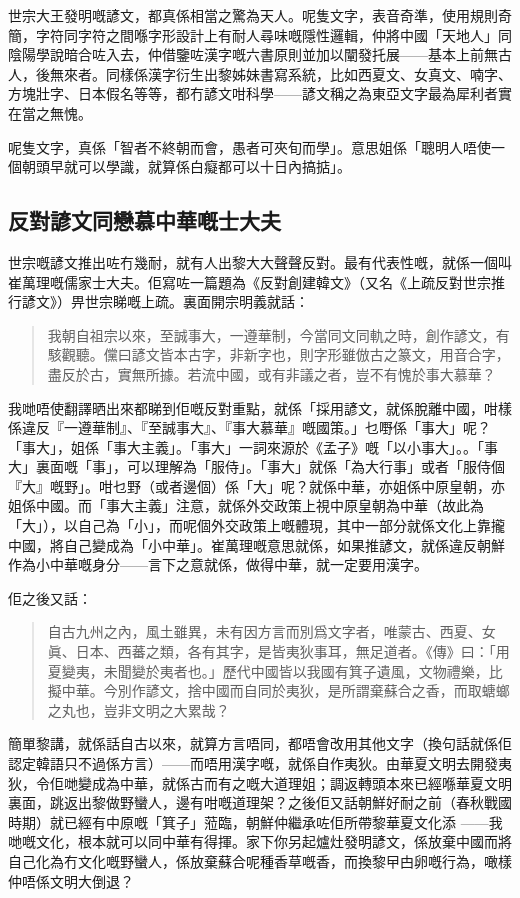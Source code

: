 世宗大王發明嘅諺文，都真係相當之驚為天人。呢隻文字，表音奇準，使用規則奇簡，字符同字符之間喺字形設計上有耐人尋味嘅隱性邏輯，仲將中國「天地人」同陰陽學說暗合咗入去，仲借鑒咗漢字嘅六書原則並加以闡發托展——基本上前無古人，後無來者。同樣係漢字衍生出黎姊妹書寫系統，比如西夏文、女真文、喃字、方塊壯字、日本假名等等，都冇諺文咁科學——諺文稱之為東亞文字最為犀利者實在當之無愧。

呢隻文字，真係「智者不終朝而會，愚者可夾旬而學」。意思姐係「聰明人唔使一個朝頭早就可以學識，就算係白癡都可以十日內搞掂」。

\subsection*{反對諺文同戀慕中華嘅士大夫}
世宗嘅諺文推出咗冇幾耐，就有人出黎大大聲聲反對。最有代表性嘅，就係一個叫崔萬理嘅儒家士大夫。佢寫咗一篇題為《反對創建韓文》（又名《上疏反對世宗推行諺文》）畀世宗睇嘅上疏。裏面開宗明義就話：
\begin{quotation}
  我朝自祖宗以來，至誠事大，一遵華制，今當同文同軌之時，創作諺文，有駭觀聽。儻曰諺文皆本古字，非新字也，則字形雖倣古之篆文，用音合字，盡反於古，實無所據。若流中國，或有非議之者，豈不有愧於事大慕華？
\end{quotation}

我哋唔使翻譯晒出來都睇到佢嘅反對重點，就係「採用諺文，就係脫離中國，咁樣係違反『一遵華制』、『至誠事大』、『事大慕華』嘅國策。」乜嘢係「事大」呢？「事大」，姐係「事大主義」。「事大」一詞來源於《孟子》嘅「以小事大」。。「事大」裏面嘅「事」，可以理解為「服侍」。「事大」就係「為大行事」或者「服侍個『大』嘅野」。咁乜野（或者邊個）係「大」呢？就係中華，亦姐係中原皇朝，亦姐係中國。而「事大主義」注意，就係外交政策上視中原皇朝為中華（故此為「大」），以自己為「小」，而呢個外交政策上嘅體現，其中一部分就係文化上靠攏中國，將自己變成為「小中華」。崔萬理嘅意思就係，如果推諺文，就係違反朝鮮作為小中華嘅身分——言下之意就係，做得中華，就一定要用漢字。

佢之後又話：

\begin{quotation}
  自古九州之內，風土雖異，未有因方言而別爲文字者，唯蒙古、西夏、女眞、日本、西蕃之類，各有其字，是皆夷狄事耳，無足道者。《傳》曰：「用夏變夷，未聞變於夷者也。」歷代中國皆以我國有箕子遺風，文物禮樂，比擬中華。今別作諺文，捨中國而自同於夷狄，是所謂棄蘇合之香，而取螗螂之丸也，豈非文明之大累哉？
\end{quotation}

簡單黎講，就係話自古以來，就算方言唔同，都唔會改用其他文字（換句話就係佢認定韓語只不過係方言）——而唔用漢字嘅，就係自作夷狄。由華夏文明去開發夷狄，令佢哋變成為中華，就係古而有之嘅大道理姐；調返轉頭本來已經喺華夏文明裏面，跳返出黎做野蠻人，邊有咁嘅道理架？之後佢又話朝鮮好耐之前（春秋戰國時期）就已經有中原嘅「箕子」蒞臨，朝鮮仲繼承咗佢所帶黎華夏文化添
——我哋嘅文化，根本就可以同中華有得揮。家下你另起爐灶發明諺文，係放棄中國而將自己化為冇文化嘅野蠻人，係放棄蘇合呢種香草嘅香，而換黎曱甴卵嘅行為，噉樣仲唔係文明大倒退？

